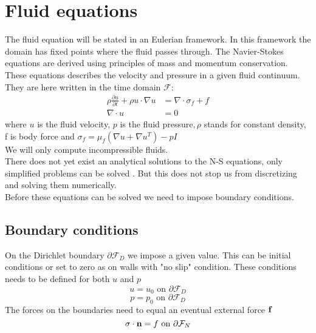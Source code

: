 
\section{Fluid equations}
The fluid equation will be stated in an Eulerian framework. In this framework the domain has fixed points where the fluid passes through. 
The Navier-Stokes equations are derived using principles of mass and momentum conservation. These equations describes the velocity and pressure in a given fluid continuum. They are here written in the time domain $\mathcal{F}$:
\begin{align}
\label{eq:NS}
\rho\frac{\partial u}{\partial t} + \rho u \cdot \nabla u &= \nabla \cdot \sigma_f + f \\
\nabla \cdot u &= 0
\end{align}
where $u$ is the fluid velocity, $p$ is the fluid pressure$, \rho$ stands for constant density, f is body force and $ \sigma_f = \mu_f (\nabla u + \nabla u^T)  - pI$ \\
We will only compute incompressible fluids. \\
There does not yet exist an analytical solutions to the N-S equations, only simplified problems can be solved \cite{White2000}. But this does not stop us from discretizing and solving them numerically. \\
Before these equations can be solved we need to impose boundary conditions.
\subsection{Boundary conditions}
On the Dirichlet boundary $ \partial \mathcal{F}_D$ we impose a given value. This can be initial conditions or set to zero as on walls with "no slip" condition. These conditions needs to be defined for both $u$ and $p$
$$  u = u_0 \text{   on   } \partial \mathcal{F}_D  $$
$$  p = p_0 \text{   on   } \partial \mathcal{F}_D  $$
The forces on the boundaries need to equal an eventual external force $ \bold{f}$
$$ \sigma \cdot \bold{n} = f \text{   on   } \partial \mathcal{F}_N    $$







